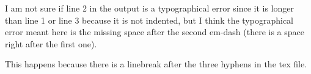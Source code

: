 I am not sure if line 2 in the output is a typographical error since it is longer than line 1 or line 3 because it is not indented, but I think the typographical error meant here is the missing space after the second em-dash (there is a space right after the first one).

This happens because there is a linebreak after the three hyphens in the tex file.
